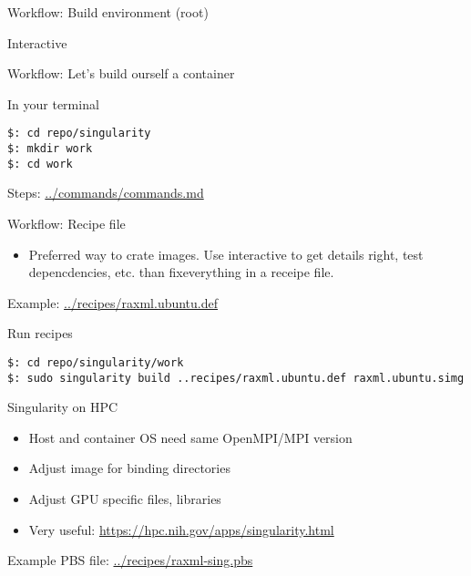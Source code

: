 \documentclass{beamer}
\begin{document}
  \begin{frame}{Workflow: Build environment (root)}
    \small
    \begin{block}{Interactive}
    \end{block}
  \end{frame}

  \begin{frame}[fragile]{Workflow: Let's build ourself a container}
  \begin{block}{In your terminal}
  \begin{verbatim}
$: cd repo/singularity
$: mkdir work
$: cd work
\end{verbatim}
  \end{block}
    Steps: \url{../commands/commands.md}
  \end{frame}

  \begin{frame}[fragile]{Workflow: Recipe file}
      \begin{itemize}
        \item Preferred way to crate images. Use interactive to get details
              right, test depencdencies, etc.  than fixeverything in a receipe
              file.
        \end{itemize}
      Example: \url{../recipes/raxml.ubuntu.def}
    \begin{block}{Run}
    \footnotesize{}
    recipes
      \begin{verbatim}
$: cd repo/singularity/work
$: sudo singularity build ..recipes/raxml.ubuntu.def raxml.ubuntu.simg
      \end{verbatim}
    \end{block}
  \end{frame}

  \begin{frame}{Singularity on HPC}
    \begin{itemize}
      \item Host and container OS need same OpenMPI/MPI version
      \item Adjust image for binding directories
      \item Adjust GPU specific files, libraries
      \item Very useful: \url{https://hpc.nih.gov/apps/singularity.html}
    \end{itemize}
    Example PBS file: \url{../recipes/raxml-sing.pbs}
  \end{frame}
\end{document}
